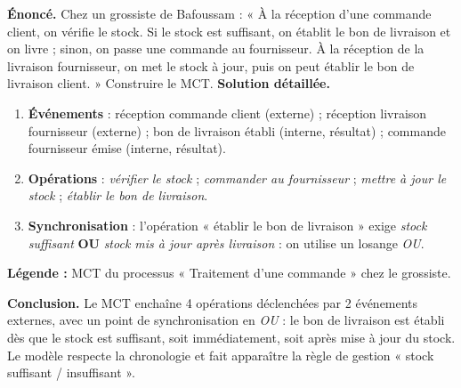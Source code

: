 \documentclass[11pt]{article}
\begin{document}
\begin{exoresolu}
\textbf{Énoncé.} Chez un grossiste de Bafoussam : « À la réception d'une commande client, on vérifie le stock. Si le stock est suffisant, on établit le bon de livraison et on livre ; sinon, on passe une commande au fournisseur. À la réception de la livraison fournisseur, on met le stock à jour, puis on peut établir le bon de livraison client. » Construire le MCT.
\tcblower
\textbf{Solution détaillée.}
\begin{enumerate}
\item \textbf{Événements} : réception commande client (externe) ; réception livraison fournisseur (externe) ; bon de livraison établi (interne, résultat) ; commande fournisseur émise (interne, résultat).
\item \textbf{Opérations} : \emph{vérifier le stock} ; \emph{commander au fournisseur} ; \emph{mettre à jour le stock} ; \emph{établir le bon de livraison}.
\item \textbf{Synchronisation} : l'opération « établir le bon de livraison » exige \emph{stock suffisant} \textbf{OU} \emph{stock mis à jour après livraison} : on utilise un losange \emph{OU}.
\end{enumerate}
\begin{center}
\par\textbf{Légende :} MCT du processus « Traitement d'une commande » chez le grossiste.
\end{center}
\textbf{Conclusion.} Le MCT enchaîne 4 opérations déclenchées par 2 événements externes, avec un point de synchronisation en \emph{OU} : le bon de livraison est établi dès que le stock est suffisant, soit immédiatement, soit après mise à jour du stock. Le modèle respecte la chronologie et fait apparaître la règle de gestion « stock suffisant / insuffisant ».
\end{exoresolu}
\end{document}

